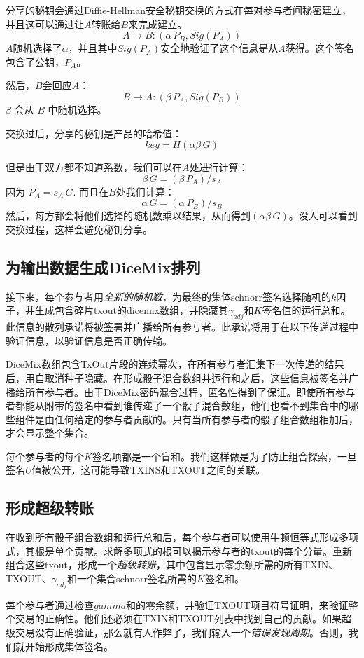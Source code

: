\documentclass[8pt,fleqn,openany]{book}
\begin{document}
\begin{CJK*}{UTF8}{gbsn}
{分享的秘钥会通过Diffie-Hellman安全秘钥交换\cite{c21}的方式在每对参与者间秘密建立，并且这可以通过让$A$转账给$B$来完成建立。 
$$A \rightarrow B: (\alpha \, P_B, Sig(P_A))$$
$A$随机选择了$\alpha$，并且其中$Sig(P_A)$安全地验证了这个信息是从$A$获得。这个签名包含了公钥，$P_A$。

然后，$B$会回应$A$：
$$B \rightarrow A: (\beta \, P_A, Sig(P_B))$$
$\beta$ 会从 $B$ 中随机选择。

交换过后，分享的秘钥是产品的哈希值：
$$key = H(\alpha \beta \, G)$$ 

但是由于双方都不知道系数，我们可以在$A$处进行计算：
$$\beta \, G = (\beta \, P_A) / s_A$$
因为 $P_A = s_A \, G$. 而且在$B$处我们计算：
$$\alpha \, G = (\alpha \, P_B) / s_B$$
然后，每方都会将他们选择的随机数乘以结果，从而得到$(\alpha \beta \, G)$。没人可以看到交换过程，这样会避免秘钥分享。

\subsection{为输出数据生成DiceMix排列} 
接下来，每个参与者用\textit{全新的随机数}，为最终的集体schnorr签名选择随机的$k$因子，并生成包含碎片txout的dicemix数组，并隐藏其$\gamma_{adj}$和$K$签名值的运行总和。此信息的散列承诺将被签署并广播给所有参与者。此承诺将用于在以下传递过程中验证信息，以验证信息是否正确传输。

DiceMix数组包含TxOut片段的连续幂次，在所有参与者汇集下一次传递的结果后，用自取消种子隐藏。在形成骰子混合数组并运行和之后，这些信息被签名并广播给所有参与者。由于DiceMix密码混合过程，匿名性得到了保证。即使所有参与者都能从附带的签名中看到谁传递了一个骰子混合数组，他们也看不到集合中的哪些组件是由任何给定的参与者贡献的。只有当所有参与者的骰子组合数组相加后，才会显示整个集合。

每个参与者的每个$K$签名项都是一个盲和。我们这样做是为了防止组合探索，一旦签名$U$值被公开，这可能导致TXINS和TXOUT之间的关联。

\subsection{形成超级转账} 
在收到所有骰子组合数组和运行总和后，每个参与者可以使用牛顿恒等式形成多项式，其根是单个贡献。求解多项式的根可以揭示参与者的txout的每个分量。重新组合这些txout，形成一个\textit{超级转账}，其中包含显示零余额所需的所有TXIN、TXOUT、$\gamma_{adj}$和一个集合schnorr签名所需的$K$签名和。

每个参与者通过检查$gamma$和的零余额，并验证TXOUT项目符号证明，来验证整个交易的正确性。他们还必须在TXIN和TXOUT列表中找到自己的贡献。如果超级交易没有正确验证，那么就有人作弊了，我们输入一个\textit{错误发现周期}。否则，我们就开始形成集体签名。

}
\end{CJK*}
\end{document}
